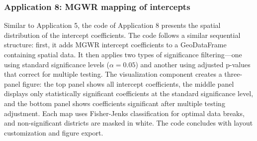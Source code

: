 \documentclass[smallextended, natbib]{svjour3}       %
\begin{document}
\subsubsection*{Application 8: MGWR mapping of intercepts}

Similar to Application 5, the code of Application 8 presents the spatial distribution of the intercept coefficients.
The code follows a similar sequential structure: first, it adds MGWR intercept coefficients to a GeoDataFrame containing spatial data. 
It then applies two types of significance filtering---one using standard significance levels ($\alpha =0.05$) and another using adjusted p-values that correct for multiple testing. 
The visualization component creates a three-panel figure: the top panel shows all intercept coefficients, the middle panel displays only statistically significant coefficients at the standard significance level, and the bottom panel shows coefficients significant after multiple testing adjustment. 
Each map uses Fisher-Jenks classification for optimal data breaks, and non-significant districts are masked in white. 
The code concludes with layout customization and figure export. 
\end{document}
